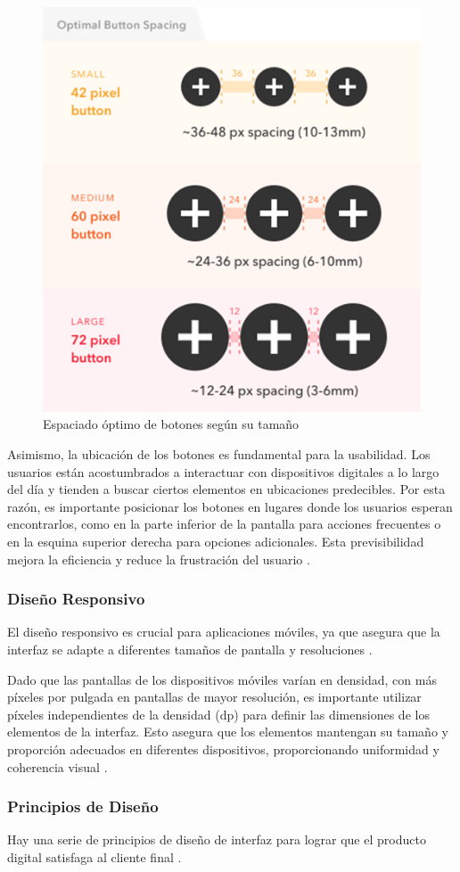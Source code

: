 \begin{figure} [H]
    \centering
    \includegraphics[width=0.5\linewidth]{figuras/optimal_space_buttons.png}
    \caption{Espaciado óptimo de botones según su tamaño}
    \label{fig:esapcio_optimo}
\end{figure}

Asimismo, la ubicación de los botones es fundamental para la usabilidad. Los usuarios están acostumbrados a interactuar con dispositivos digitales a lo largo del día y tienden a buscar ciertos elementos en ubicaciones predecibles. Por esta razón, es importante posicionar los botones en lugares donde los usuarios esperan encontrarlos, como en la parte inferior de la pantalla para acciones frecuentes o en la esquina superior derecha para opciones adicionales. Esta previsibilidad mejora la eficiencia y reduce la frustración del usuario \cite{Pickaso2022}.


\subsubsection{Diseño Responsivo}
El diseño responsivo es crucial para aplicaciones móviles, ya que asegura que la interfaz se adapte a diferentes tamaños de pantalla y resoluciones \cite{Becos2024}.

Dado que las pantallas de los dispositivos móviles varían en densidad, con más píxeles por pulgada en pantallas de mayor resolución, es importante utilizar píxeles independientes de la densidad (dp) para definir las dimensiones de los elementos de la interfaz. Esto asegura que los elementos mantengan su tamaño y proporción adecuados en diferentes dispositivos, proporcionando uniformidad y coherencia visual \cite{Pickaso2022}.

\subsubsection{Principios de Diseño}
Hay una serie de principios de diseño de interfaz para lograr que el producto digital satisfaga al cliente final \cite{AnonimoUX}.

